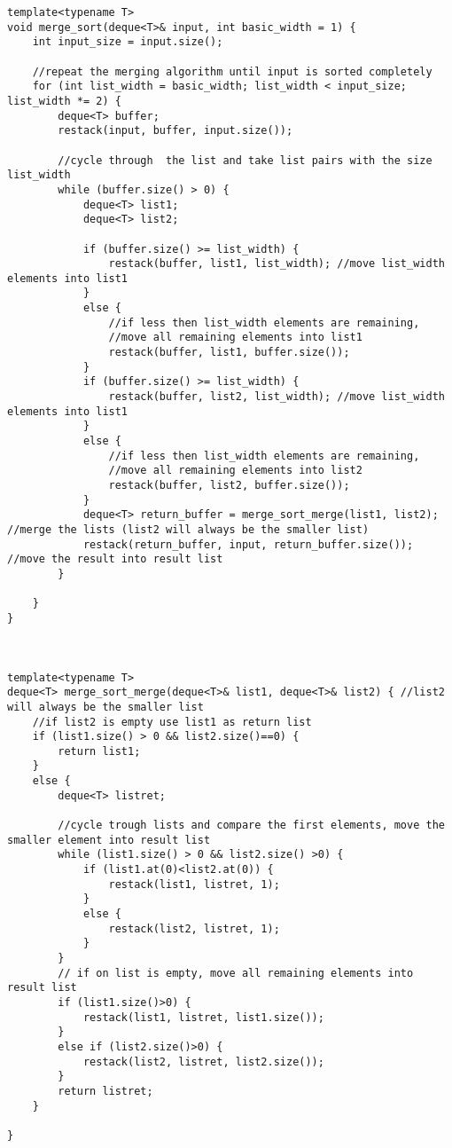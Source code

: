 \begin{lstlisting}
template<typename T>
void merge_sort(deque<T>& input, int basic_width = 1) {
	int input_size = input.size();
	
	//repeat the merging algorithm until input is sorted completely
	for (int list_width = basic_width; list_width < input_size; list_width *= 2) {
		deque<T> buffer;
		restack(input, buffer, input.size());
		
		//cycle through  the list and take list pairs with the size list_width
		while (buffer.size() > 0) {
			deque<T> list1;
			deque<T> list2;
			
			if (buffer.size() >= list_width) {
				restack(buffer, list1, list_width); //move list_width elements into list1
			}
			else {
				//if less then list_width elements are remaining, 
				//move all remaining elements into list1
				restack(buffer, list1, buffer.size());
			}
			if (buffer.size() >= list_width) {
				restack(buffer, list2, list_width); //move list_width elements into list1
			}
			else {
				//if less then list_width elements are remaining, 
				//move all remaining elements into list2
				restack(buffer, list2, buffer.size());
			}
			deque<T> return_buffer = merge_sort_merge(list1, list2); //merge the lists (list2 will always be the smaller list)
			restack(return_buffer, input, return_buffer.size()); //move the result into result list
		}

	}
}



template<typename T>
deque<T> merge_sort_merge(deque<T>& list1, deque<T>& list2) { //list2 will always be the smaller list
	//if list2 is empty use list1 as return list
	if (list1.size() > 0 && list2.size()==0) {
		return list1;
	}
	else {
		deque<T> listret;

		//cycle trough lists and compare the first elements, move the smaller element into result list
		while (list1.size() > 0 && list2.size() >0) {
			if (list1.at(0)<list2.at(0)) {
				restack(list1, listret, 1);
			}
			else {
				restack(list2, listret, 1);
			}
		}
		// if on list is empty, move all remaining elements into result list
		if (list1.size()>0) {
			restack(list1, listret, list1.size());
		}
		else if (list2.size()>0) {
			restack(list2, listret, list2.size());
		}
		return listret;
	}

}
\end{lstlisting}

